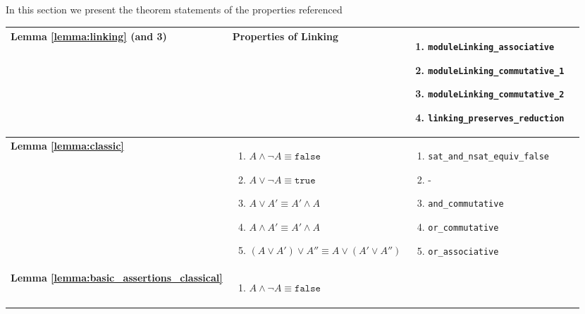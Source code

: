  In this section we present the theorem statements of the properties referenced 

\begin{table}
  \begin{tabular}{|l|l|l|l|}
    \hline

\textbf{Lemma \ref{lemma:linking} (and 3)} &
Properties of Linking
        & 
\parbox{.45\textwidth}{\scriptsize\begin{enumerate}[label={(\arabic*)}]
            \item \texttt{moduleLinking\_associative}
            \item \texttt{moduleLinking\_commutative\_1}
            \item \texttt{moduleLinking\_commutative\_2}
            \item \texttt{linking\_preserves\_reduction}
        \end{enumerate}}
        \\
\hline
\textbf{Lemma \ref{lemma:classic}} &   
\parbox{.45\textwidth}{\scriptsize\begin{enumerate}[label={(\arabic*)}]
            \item $A \wedge \neg A \equiv \texttt{false}$
            \item $A \vee \neg A \equiv \texttt{true}$
            \item $A \vee A' \equiv A' \wedge A$
            \item $A \wedge A' \equiv A' \wedge A$
            \item $(A \vee A') \vee A'' \equiv A \vee (A' \vee A'')$
        \end{enumerate}}
        & 
\parbox{.45\textwidth}{\scriptsize\begin{enumerate}[label={(\arabic*)}]
            \item \texttt{sat\_and\_nsat\_equiv\_false}
            \item -
            \item \texttt{and\_commutative}
            \item \texttt{or\_commutative}
            \item \texttt{or\_associative}
        \end{enumerate}}
        \\
\hline
\textbf{Lemma \ref{lemma:basic_assertions_classical}} &   
\parbox{.45\textwidth}{\scriptsize\begin{enumerate}[label={(\arabic*)}]
            \item $A \wedge \neg A \equiv \texttt{false}$

\end{enumerate}}
\end{tabular}
\end{table}
